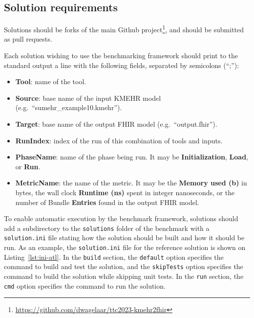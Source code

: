 \documentclass[
twocolumn,
]{ceurart}
\newcommand*{\file}[1]{\texttt{#1}}
\begin{document}
\subsection{Solution requirements}
\label{sec:solut-requ}

Solutions should be forks of the main Github
project\footnote{\url{https://github.com/dwagelaar/ttc2023-kmehr2fhir}},
and should be submitted as pull requests.

Each solution wishing to use the benchmarking framework should print to the
standard output a line with the following fields, separated by semicolons
(``;''):

\begin{itemize}
\item \textbf{Tool}: name of the tool.
\item \textbf{Source}: base name of the input KMEHR model (e.g.\ ``sumehr\_example10.kmehr'').
\item \textbf{Target}: base name of the output FHIR model (e.g.\ ``output.fhir'').
\item \textbf{RunIndex}: index of the run of this combination of tools and inputs.
\item \textbf{PhaseName}: name of the phase being run. It may be \textbf{Initialization},
  \textbf{Load}, or \textbf{Run}.
\item \textbf{MetricName}: the name of the metric. It may be the
  \textbf{Memory used (b)} in bytes, the wall clock \textbf{Runtime (ns)} spent in integer
  nanoseconds, or the number of Bundle \textbf{Entries} found in the
  output FHIR model.
\end{itemize}



To enable automatic execution by the benchmark framework, solutions should add a
subdirectory to the \file{solutions} folder of the benchmark with a
\file{solution.ini} file stating how the solution should be built and how it
should be run. As an example, the \file{solution.ini} file for the reference
solution is shown on Listing~\ref{lst:ini-atl}. In the \file{build} section, the
\file{default} option specifies the command to build and test the solution, and
the \file{skipTests} option specifies the command to build the solution while
skipping unit tests. In the \file{run} section, the \file{cmd} option specifies
the command to run the solution.
\end{document}
